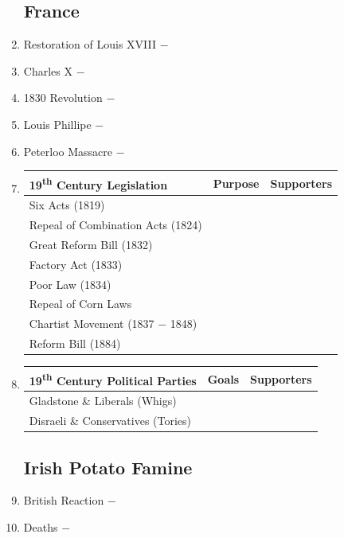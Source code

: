 \documentclass[12pt]{article}
\begin{document}
\begin{enumerate}
\subsection{France}

\item Restoration of Louis XVIII $-$ 

\item Charles X $-$ 

\item 1830 Revolution $-$ 

\item Louis Phillipe $-$

\item Peterloo Massacre $-$ 

\item \begin{tabular}{l c c}

19\textsuperscript{th} Century Legislation & Purpose & Supporters \\
\hline
Six Acts (1819) & & \\
\hline
Repeal of Combination Acts (1824) & & \\
\hline
Great Reform Bill (1832) & & \\
\hline
Factory Act (1833) & & \\
\hline
Poor Law (1834) & & \\
\hline
Repeal of Corn Laws & & \\
\hline
Chartist Movement (1837 $-$ 1848) & & \\
\hline 
Reform Bill (1884) & & \\
\end{tabular}

\item \begin{tabular}{l c c}
\hline
19\textsuperscript{th} Century Political Parties & Goals & Supporters \\
\hline
Gladstone \& Liberals (Whigs) & & \\
\hline
Disraeli \& Conservatives (Tories) & & \\
\hline
\end{tabular}

\subsection{Irish Potato Famine}
\item British Reaction $-$ 

\item Deaths $-$ 


\end{enumerate}
\end{document}
